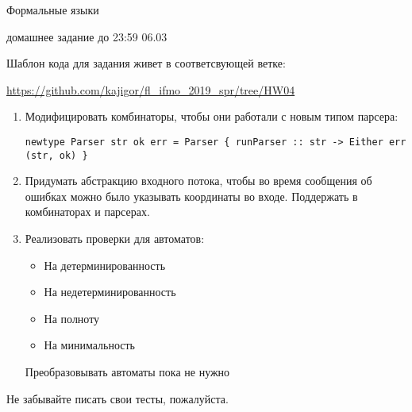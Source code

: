 \documentclass{article}
\begin{document}
\begin{center} {\LARGE Формальные языки} \end{center}

\begin{center} {\Large домашнее задание до 23:59 06.03} \end{center}
\bigskip

Шаблон кода для задания живет в соответсвующей ветке: 

\href{https://github.com/kajigor/fl_ifmo_2019_spr/tree/HW04}{https://github.com/kajigor/fl\_ifmo\_2019\_spr/tree/HW04}

\begin{enumerate}
  \item 
  {
    Модифицировать комбинаторы, чтобы они работали с новым типом парсера: 
    
    \verb!newtype Parser str ok err = Parser { runParser :: str -> Either err (str, ok) }!
  }
  
  \item 
  {
  Придумать абстракцию входного потока, чтобы во время сообщения об ошибках можно было указывать координаты во входе. Поддержать в комбинаторах и парсерах.
  }
  
  \item
  {
    Реализовать проверки для автоматов: 
    
    \begin{itemize} 
      \item На детерминированность
      \item На недетерминированность
      \item На полноту
      \item На минимальность
    \end{itemize}
    
    Преобразовывать автоматы пока не нужно
  }
\end{enumerate}


    Не забывайте писать свои тесты, пожалуйста. 
\end{document}
